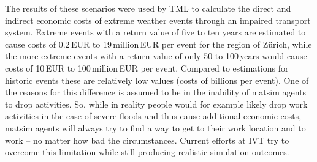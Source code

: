 The results of these scenarios were used by TML to calculate the direct and indirect economic costs of extreme weather events through an impaired transport system. Extreme events with a return value of five to ten years are estimated to cause costs of 0.2\,EUR to 19\,million\,EUR per event for the region of Zürich, while the more extreme events with a return value of only 50 to 100\,years would cause costs of 10\,EUR to 100\,million\,EUR per event. Compared to estimations for historic events these are relatively low values (costs of billions per event). One of the reasons for this difference is assumed to be in the inability of \gls{matsim} agents to drop activities. So, while in reality people would for example likely drop work activities in the case of severe floods and thus cause additional economic costs, \gls{matsim} agents will always try to find a way to get to their work location and to work – no matter how bad the circumstances. Current efforts at IVT try to overcome this limitation while still producing realistic simulation outcomes.







